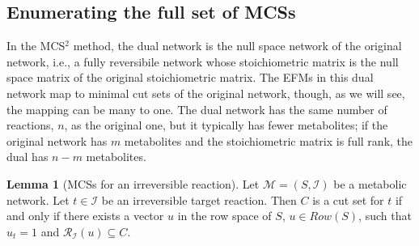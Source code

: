 \documentclass{bioinfo}
\theoremstyle{plain}
\theoremstyle{definition}
\newtheorem{lemma}{Lemma} %
\begin{document}
\subsection{Enumerating the full set of MCSs}
In the MCS$^2$ method, the dual network is the null space network of the original network, i.e., a fully reversibile network whose stoichiometric matrix is the null space matrix of the original stoichiometric matrix. The EFMs in this dual network map to minimal cut sets of the original network, though, as we will see, the mapping can be many to one. The dual network has the same number of reactions, $n$, as the original one, but it typically has fewer metabolites; if the original network has $m$ metabolites and the stoichiometric matrix is full rank, the dual has $n - m$ metabolites. %

\begin{lemma} [MCSs for an irreversible reaction] \label{GC}
Let $\mathcal{M} = (S, \mathcal{I})$ be a metabolic network. Let $t \in \mathcal{I}$ be an irreversible target reaction. Then $C$ is a cut set for $t$ if and only if there exists a vector $u$ in the row space of $S$, $u \in Row(S)$, such that $u_t = 1$ and $\mathcal{R}_{\mathcal{I}}(u) \subseteq C$.
\end{lemma}
\end{document}
